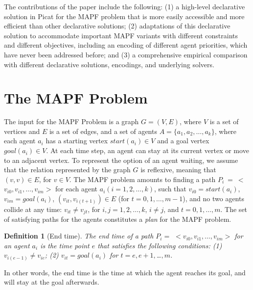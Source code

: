 \documentclass[conference]{IEEEtran}
\newtheorem{definition}{Definition}
\begin{document}
The contributions of the paper include the following: (1) a high-level declarative solution in Picat for the MAPF problem that is more easily accessible and more efficient than other declarative solutions; (2) 
adaptations of this declarative solution to  accommodate important MAPF variants with different constraints and different objectives, including an encoding of different agent priorities, which have never been addressed before; 
and (3) a comprehensive empirical comparison with different declarative solutions, encodings, and underlying solvers. 

\section{The MAPF Problem}
The input for the MAPF Problem is a graph $G = (V, E)$, where $V$ is a set of vertices and $E$ is a set of edges, and a set of agents $A = \{a_1, a_2, \ldots, a_k\}$, where each agent $a_i$ has a starting vertex $start(a_i) \in V$ and a goal vertex $goal(a_i) \in  V$. 
At each time step, an agent can stay at its current vertex or move to an adjacent vertex. To represent the option of an agent waiting, we assume that the relation represented by the graph $G$ is reflexive, meaning that $(v, v) \in E$, for $v \in V$.
The MAPF problem amounts to finding a path $P_i\ =\ $$<$$v_{i0}, v_{i1}, \ldots, v_{im}$$>$ for each agent $a_i (i = 1, 2, \ldots, k)$, such that $v_{i0} = start(a_i)$, $v_{im} = goal(a_i)$, $(v_{it}, v_{i(t+1)}) \in E$ (for $t = 0, 1, \ldots, m-1$), and no two agents collide at any time: $v_{it} \neq v_{jt}$, for $i,j = 1, 2, \ldots, k$, $i \neq j$, and $t = 0, 1, \ldots, m$. The set of satisfying paths for the agents constitutes a {\em plan} for the MAPF problem. 


\begin{definition}[End time]
The \textit{end time} of a path $P_i =$ $<$$v_{i0}, v_{i1}, \ldots, v_{im}$$>$ for an agent $a_i$ is the time point $e$ that satisfies the following conditions: (1) $v_{i(e-1)} \neq v_{ie}$; (2) $v_{it} = goal(a_i)$ for $t = e, e+1, $\ldots$, m$.

\end{definition}
In other words, the end time %
is the time at which the agent reaches its goal, and will stay at the goal afterwards. 
\end{document}
